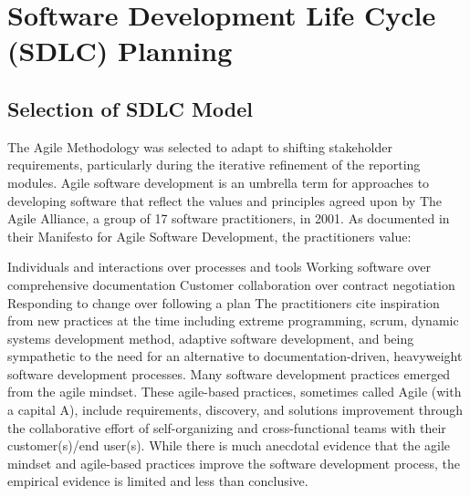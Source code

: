 \documentclass[12pt,a4paper]{report}
\begin{document}
\section{Software Development Life Cycle (SDLC) Planning}
\subsection{Selection of SDLC Model}
The Agile Methodology was selected to adapt to shifting stakeholder requirements, particularly during the iterative refinement of the reporting modules.
Agile software development is an umbrella term for approaches to developing software that reflect the values and principles agreed upon by The Agile Alliance, a group of 17 software practitioners, in 2001. As documented in their Manifesto for Agile Software Development, the practitioners value: 

Individuals and interactions over processes and tools
Working software over comprehensive documentation
Customer collaboration over contract negotiation
Responding to change over following a plan
The practitioners cite inspiration from new practices at the time including extreme programming, scrum, dynamic systems development method, adaptive software development, and being sympathetic to the need for an alternative to documentation-driven, heavyweight software development processes.
Many software development practices emerged from the agile mindset. These agile-based practices, sometimes called Agile (with a capital A), include requirements, discovery, and solutions improvement through the collaborative effort of self-organizing and cross-functional teams with their customer(s)/end user(s).
While there is much anecdotal evidence that the agile mindset and agile-based practices improve the software development process, the empirical evidence is limited and less than conclusive.
\end{document}

